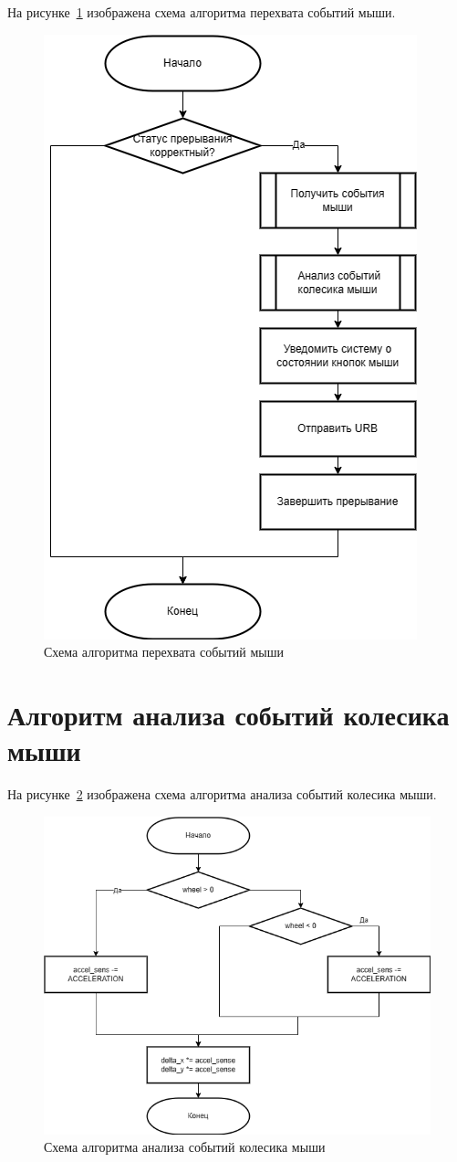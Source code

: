 На рисунке~\ref{fig:algo} изображена схема алгоритма перехвата событий мыши.
\captionsetup{justification=centering,singlelinecheck=false}
\begin{figure}[H]
	\centering
	\includegraphics[width=0.7\linewidth]{inc/algo}
	\caption[]{Схема алгоритма перехвата событий мыши}
	\label{fig:algo}
\end{figure}

\section{Алгоритм анализа событий колесика мыши}

На рисунке~\ref{fig:algo-wheel} изображена схема алгоритма анализа событий колесика мыши.
\captionsetup{justification=centering,singlelinecheck=false}
\begin{figure}[H]
	\centering
	\includegraphics[width=0.8\linewidth]{inc/algo-wheel}
	\caption[]{Схема алгоритма анализа событий колесика мыши}
	\label{fig:algo-wheel}
\end{figure}